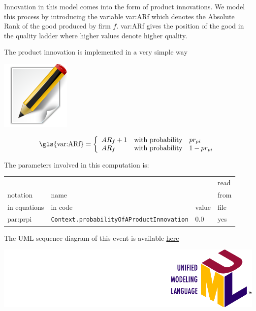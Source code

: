 \documentclass{book}
\newcommand{\doclocation}{file:///Users/giulioni/Documents/workspace/gabriele/docs}
\begin{document}
Innovation in this model comes into the form of product innovations. We model this process by introducing the variable \gls{var:ARf} which denotes the Absolute Rank of the good produced by firm $f$.  
\gls{var:ARf} gives the position of the good in the quality ladder where higher values denote higher quality.

The product innovation is implemented in a very simple way\begin{marginfigure}\hskip23mm
	\includegraphics[scale=0.2]{edit.png}
\end{marginfigure}


\[
	\textnormal{\gls{var:ARf}} =\left\{ 
		\begin{array}{l l l}
			AR_{f}+1&\textnormal{with probability}& pr_{pi}\\
			AR_{f}&\textnormal{with probability}& 1-pr_{pi}\\
		\end{array}
		\right.
\]

The parameters involved in this computation is:

\vskip2mm
\noindent
\begin{tabular}{l l l l}
	\hline
	& &&read\\
	notation& name &&from\\
	in equations& in code&value&file\\
	\hline
	\hline
\gls{par:prpi}&\verb+Context.probabilityOfAProductInnovation+&0.0&yes\\
	\hline
\end{tabular}

\vskip3mm
The UML sequence diagram of this event is available \href{\doclocation/umldoc/stepProductInnovatioProcess.html}{here}
\begin{marginfigure}
	\includegraphics[scale=0.1]{uml.png}
\end{marginfigure}
\end{document}
